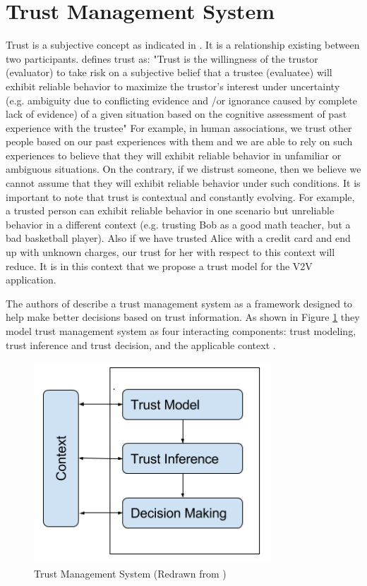 \documentclass[conference]{IEEEtran}
\begin{document}
\section{Trust Management System} \label{lreview}
Trust is a subjective concept as indicated in \cite{undTrustSwJHRR}. It is a relationship existing between two participants. \cite{trustSurvey2015} defines trust as:
\newline
\newline
"Trust is the willingness of the trustor (evaluator) to take risk on a subjective belief that a trustee (evaluatee) will exhibit reliable behavior to maximize the trustor’s interest under uncertainty (e.g. ambiguity due to conflicting evidence and /or ignorance caused by complete lack of evidence) of a given situation based on the cognitive assessment of past experience with the trustee"
\newline
\newline
For example, in human associations, we trust other people based on our past experiences with them and we are able to rely on such experiences to believe that they will exhibit reliable behavior in unfamiliar or ambiguous situations. On the contrary, if we distrust someone, then we believe we cannot assume that they will exhibit reliable behavior under such conditions. It is important to note that trust is contextual and constantly evolving. For example, a trusted person can exhibit reliable behavior in one scenario but unreliable behavior in a different context (e.g. trusting Bob as a good math teacher, but a bad basketball player). Also if we have trusted Alice with a credit card and end up with unknown charges, our trust for her with respect to this context will reduce. It is in this context that we propose a trust model for the V2V application.

The authors of \cite{artIntel2005} describe a trust management system as a framework designed to help make better decisions based on trust information. As shown in Figure \ref{tmanagement} they model trust management system as four interacting components: trust modeling, trust inference and trust decision, and the applicable context \cite{artIntel2005}.

\begin{figure}[h]
\centering
\includegraphics[width=3.5in]{Trust_Management_System.png}
\caption{Trust Management System (Redrawn from \cite{artIntel2005})}
\label{tmanagement}
\end{figure}
\end{document}
